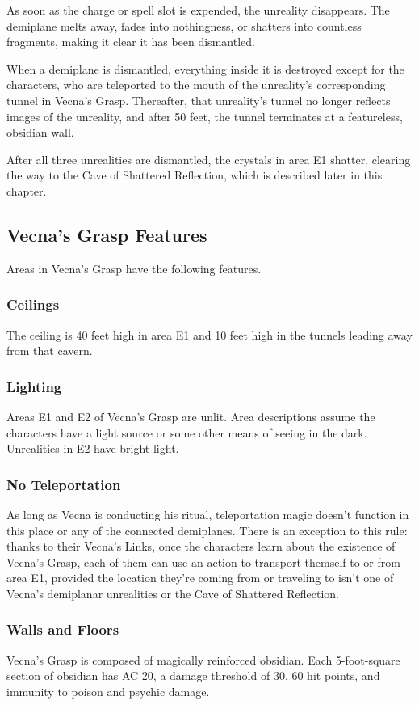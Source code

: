 \documentclass[10pt,a4paper,twoside,bg=print,twocolumn,openany,nodeprecatedcode]{dndbook}
\begin{document}
As soon as the charge or spell slot is expended, the unreality disappears. The demiplane melts away, fades into nothingness, or shatters into countless fragments, making it clear it has been dismantled.

When a demiplane is dismantled, everything inside it is destroyed except for the characters, who are teleported to the mouth of the unreality's corresponding tunnel in Vecna's Grasp. Thereafter, that unreality's tunnel no longer reflects images of the unreality, and after 50 feet, the tunnel terminates at a featureless, obsidian wall.

After all three unrealities are dismantled, the crystals in area E1 shatter, clearing the way to the Cave of Shattered Reflection, which is described later in this chapter.

\subsection{Vecna's Grasp Features}
Areas in Vecna's Grasp have the following features.

\subsubsection{Ceilings}
The ceiling is 40 feet high in area E1 and 10 feet high in the tunnels leading away from that cavern.

\subsubsection{Lighting}
Areas E1 and E2 of Vecna's Grasp are unlit. Area descriptions assume the characters have a light source or some other means of seeing in the dark. Unrealities in E2 have bright light.

\subsubsection{No Teleportation}
As long as Vecna is conducting his ritual, teleportation magic doesn't function in this place or any of the connected demiplanes. There is an exception to this rule: thanks to their Vecna's Links, once the characters learn about the existence of Vecna's Grasp, each of them can use an action to transport themself to or from area E1, provided the location they're coming from or traveling to isn't one of Vecna's demiplanar unrealities or the Cave of Shattered Reflection.

\subsubsection{Walls and Floors}
Vecna's Grasp is composed of magically reinforced obsidian. Each 5-foot-square section of obsidian has AC 20, a damage threshold of 30, 60 hit points, and immunity to poison and psychic damage.
\end{document}
